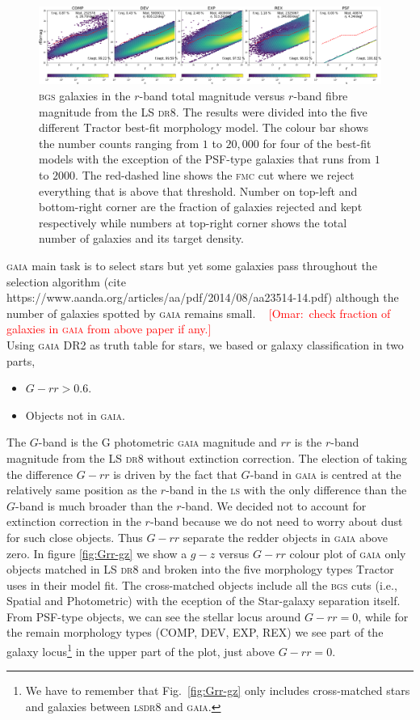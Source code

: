 \documentclass[fleqn,usenatbib]{mnras}
\newcommand{\omar}[1]{~\newline\noindent \textcolor{red}{{ [Omar:~{#1}]\\}}}
\newcommand{\BGS}{\textsc{bgs}\xspace}
\newcommand{\DReight}{\textsc{dr8}\xspace}
\newcommand{\FMC}{{\textsc{fmc}}\xspace}
\newcommand{\GAIA}{\textsc{gaia}\xspace}
\newcommand{\LS}{\textsc{ls}\xspace}
\newcommand{\TRACTOR}{\textsc{T}ractor\xspace}
\begin{document}
\begin{figure}
	\includegraphics[width=19cm]{images/r_rfibmag_bgsbutfmc_hexbin}
    \caption{ \BGS galaxies in the $r$-band total magnitude versus $r$-band fibre magnitude from the LS \DReight. The results were divided into the five different \TRACTOR best-fit morphology model. The colour bar shows the number counts ranging from $1$ to $20,000$ for four of the best-fit models with the exception of the PSF-type galaxies that runs from $1$ to $2000$. The red-dashed line shows the \FMC cut where we reject everything that is above that threshold. Number on top-left and bottom-right corner are the fraction of galaxies rejected and kept respectively while numbers at top-right corner shows the total number of galaxies and its target density.}
    \label{fig:fmc}
\end{figure}

\GAIA main task is to select stars but yet some galaxies pass throughout the selection algorithm (cite https://www.aanda.org/articles/aa/pdf/2014/08/aa23514-14.pdf) although the number of galaxies spotted by \GAIA remains small. \omar{check fraction of galaxies in \GAIA from above paper if any.} Using \GAIA DR2 as truth table for stars, we based or galaxy classification in two parts,

\begin{itemize}
    \item $G-rr > 0.6$.
    \item Objects not in \GAIA.
\end{itemize}

The $G$-band is the G photometric \GAIA magnitude and $rr$ is the $r$-band magnitude from the LS \DReight without extinction correction. The election of taking the difference $G-rr$ is driven by the fact that $G$-band in \GAIA is centred at the relatively same position as the $r$-band in the \LS with the only difference than the $G$-band is much broader than the $r$-band. We decided not to account for extinction correction in the $r$-band because we do not need to worry about dust for such close objects. Thus $G-rr$ separate the redder objects in \GAIA above zero. In figure \ref{fig:Grr-gz} we show a $g-z$ versus $G-rr$ colour plot of \GAIA only objects matched in LS \DReight and broken into the five morphology types \TRACTOR uses in their model fit. The cross-matched objects include all the \BGS cuts (i.e., Spatial and Photometric) with the eception of the Star-galaxy separation itself. From PSF-type objects, we can see the stellar locus around $G-rr=0$, while for the remain morphology types (COMP, DEV, EXP, REX) we see part of the galaxy locus\footnote{We have to remember that Fig.~\ref{fig:Grr-gz} only includes cross-matched stars and galaxies between \LS \DReight and \GAIA.} in the upper part of the plot, just above $G-rr=0$. 
\end{document}
